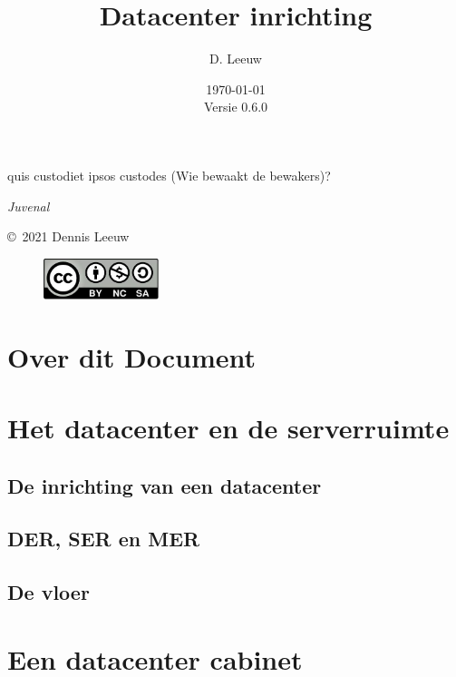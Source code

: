 \documentclass[a4paper,12pt,twoside,openright,titlepage]{book}
\author{D. Leeuw}
\title{Datacenter inrichting}
\date{\today\\Versie 0.6.0}
\begin{document}

\maketitle

\epigraph{quis custodiet ipsos custodes (Wie bewaakt de bewakers)?}{\textit{Juvenal}}

\newpage

\copyright\ 2021 Dennis Leeuw\\

\begin{figure}[H]
\includegraphics[width=0.3\textwidth]{CC-BY-SA-NC.png}
\end{figure}

\bigskip




\frontmatter
\chapter{Over dit Document}



\tableofcontents

\mainmatter

\chapter{Het datacenter en de serverruimte}

\section{De inrichting van een datacenter}

\section{DER, SER en MER}

\section{De vloer}


\chapter{Een datacenter cabinet}

\end{document}
